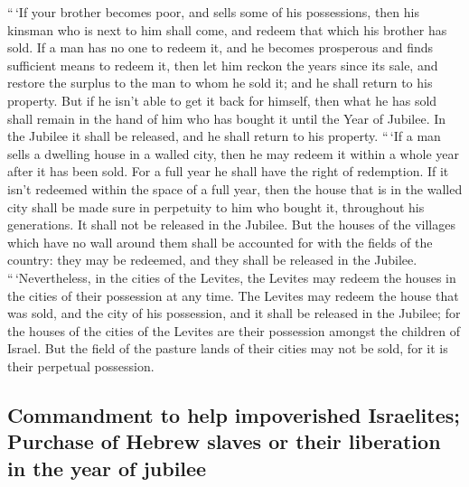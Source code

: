  ``\,`If your brother becomes poor, and sells some of his
possessions, then his kinsman who is next to him shall come, and redeem
that which his brother has sold.  If a man has no one to
redeem it, and he becomes prosperous and finds sufficient means to
redeem it,  then let him reckon the years since its sale,
and restore the surplus to the man to whom he sold it; and he shall
return to his property.  But if he isn't able to get it
back for himself, then what he has sold shall remain in the hand of him
who has bought it until the Year of Jubilee. In the Jubilee it shall be
released, and he shall return to his property.  ``\,`If a
man sells a dwelling house in a walled city, then he may redeem it
within a whole year after it has been sold. For a full year he shall
have the right of redemption.  If it isn't redeemed
within the space of a full year, then the house that is in the walled
city shall be made sure in perpetuity to him who bought it, throughout
his generations. It shall not be released in the Jubilee.
 But the houses of the villages which have no wall around
them shall be accounted for with the fields of the country: they may be
redeemed, and they shall be released in the Jubilee. 
``\,`Nevertheless, in the cities of the Levites, the Levites may redeem
the houses in the cities of their possession at any time.
 The Levites may redeem the house that was sold, and the
city of his possession, and it shall be released in the Jubilee; for the
houses of the cities of the Levites are their possession amongst the
children of Israel.  But the field of the pasture lands
of their cities may not be sold, for it is their perpetual possession.

\hypertarget{commandment-to-help-impoverished-israelites-purchase-of-hebrew-slaves-or-their-liberation-in-the-year-of-jubilee}{%
\subsection{Commandment to help impoverished Israelites; Purchase of
Hebrew slaves or their liberation in the year of
jubilee}\label{commandment-to-help-impoverished-israelites-purchase-of-hebrew-slaves-or-their-liberation-in-the-year-of-jubilee}}

